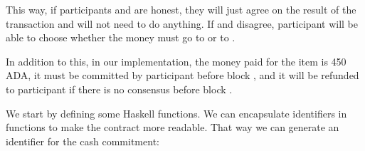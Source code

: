 \documentclass[runningheads]{llncs}
\begin{document}
This way, if participants  and  are honest, they will just agree on the result of the 
transaction and  will not need to do anything. If  and  disagree, 
participant  will be able to choose whether the money must go to  or to 
.

In addition to this, in our implementation, the money paid for the item is 450 ADA, it must be committed by participant 
 before block , and it will be refunded to participant  if there is 
no consensus before block .

We start by defining some Haskell functions. We can encapsulate identifiers in functions to make the contract more 
readable. That way we can generate an identifier for the cash commitment:
\end{document}
